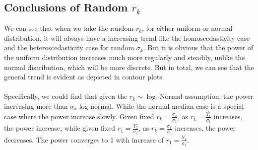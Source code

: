 \documentclass[10pt,english]{article}\usepackage{graphicx, color}
\numberwithin{equation}{section}
\numberwithin{figure}{section}
\begin{document}
\subsection{Conclusions of Random $r_k$}
We can see that when we take the random $r_k$, for either uniform or normal distribution, it will always have a increasing trend like the homoscedasticity case and the heteroscedasticity case for random $\sigma_k$. But it is obvious that the power of the uniform distribution increases much more regularly and steadily, unlike the normal distribution, which will be more discrete. But in total, we can see that the general trend is evident as depicted in contour plots.\\
\quad\\
Specifically, we could find that given the $r_k \sim\log{\text{-Normal}}$ assumption, the power increasing more than $\sigma_k$ log-normal. While the normal-median case is a special case where the power increase slowly. Given fixed $r_k = \frac{\sigma_k}{\sigma_1}$, as $r_1 = \frac{\bar{Y_1}}{\sigma_1}$  increases, the power increase, while given fixed $r_1 = \frac{\bar{Y_1}}{\sigma_1}$, as $r_k = \frac{\sigma_k}{\sigma_1}$  increases, the power decreases. The power converges to 1 with increase of $r_1 = \frac{\bar{Y_1}}{\sigma_1}$.
\end{document}
